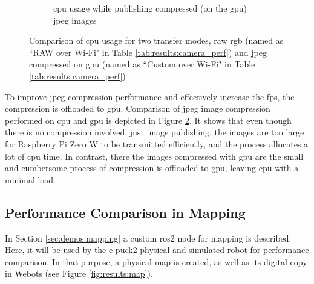 \begin{figure}[H]
\begin{subfigure}{.8\textwidth}
  \caption{\ac{cpu} usage while publishing compressed (on the \ac{gpu}) \ac{jpeg} images}
  \label{fig:results:camera_load:jpeg_gpu}
\end{subfigure}
\caption[Comparison of \ac{cpu} usage for two transfer modes, raw \ac{rgb} and \ac{jpeg} compressed on \ac{gpu}]{Comparison of \ac{cpu} usage for two transfer modes, raw \ac{rgb} (named as ``RAW over Wi-Fi" in Table \ref{tab:results:camera_perf}) and \ac{jpeg} compressed on \ac{gpu} (named as ``Custom over Wi-Fi" in Table \ref{tab:results:camera_perf})}
\label{fig:results:camera_load}
\end{figure}

To improve \ac{jpeg} compression performance and effectively increase the \ac{fps}, the compression is offloaded to \ac{gpu}.
Comparison of \ac{jpeg} image compression performed on \ac{cpu} and \ac{gpu} is depicted in Figure \ref{fig:results:camera_load}.
It shows that even though there is no compression involved, just image publishing, the images are too large for Raspberry Pi Zero W to be transmitted efficiently, and the process allocates a lot of \ac{cpu} time.
In contrast, there the images compressed with \ac{gpu} are the small and cumbersome process of compression is offloaded to \ac{gpu}, leaving \ac{cpu} with a minimal load.

\subsection{Performance Comparison in Mapping}
In Section \ref{sec:demos:mapping} a custom \ac{ros2} node for mapping is described. Here, it will be used by the e-puck2 physical and simulated robot for performance comparison. In that purpose, a physical map is created, as well as its digital copy in Webots (see Figure \ref{fig:results:map}).

